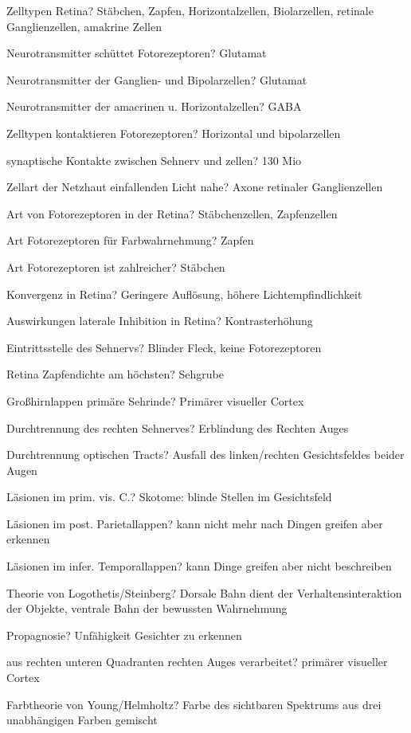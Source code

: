 \documentclass[a4paper]{article}
\begin{document}
\begin{multicols}{3}
  Zelltypen Retina? Stäbchen, Zapfen, Horizontalzellen, Biolarzellen, retinale Ganglienzellen, amakrine Zellen

  Neurotransmitter schüttet Fotorezeptoren? Glutamat

  Neurotransmitter der Ganglien- und Bipolarzellen? Glutamat

  Neurotransmitter der amacrinen u. Horizontalzellen? GABA

  Zelltypen kontaktieren Fotorezeptoren? Horizontal und bipolarzellen

  synaptische Kontakte zwischen Sehnerv und zellen? 130 Mio

  Zellart der Netzhaut einfallenden Licht nahe? Axone retinaler Ganglienzellen

  Art von Fotorezeptoren in der Retina? Stäbchenzellen, Zapfenzellen

  Art Fotorezeptoren für Farbwahrnehmung? Zapfen

  Art Fotorezeptoren ist zahlreicher? Stäbchen

  Konvergenz in Retina? Geringere Auflösung, höhere Lichtempfindlichkeit

  Auswirkungen laterale Inhibition in Retina? Kontrasterhöhung

  Eintrittsstelle des Sehnervs? Blinder Fleck, keine Fotorezeptoren

  Retina Zapfendichte am höchsten? Sehgrube

  Großhirnlappen primäre Sehrinde? Primärer visueller Cortex

  Durchtrennung des rechten Sehnerves? Erblindung des Rechten Auges

  Durchtrennung optischen Tracts? Ausfall des linken/rechten Gesichtsfeldes beider Augen

  Läsionen im prim. vis. C.? Skotome: blinde Stellen im Gesichtsfeld

  Läsionen im post. Parietallappen? kann nicht mehr nach Dingen greifen aber erkennen

  Läsionen im infer. Temporallappen? kann Dinge greifen aber nicht beschreiben

  Theorie von Logothetis/Steinberg? Dorsale Bahn dient der Verhaltensinteraktion der Objekte, ventrale Bahn der bewussten Wahrnehmung

  Propagnosie? Unfähigkeit Gesichter zu erkennen

  aus rechten unteren Quadranten rechten Auges verarbeitet? primärer visueller Cortex

  Farbtheorie von Young/Helmholtz? Farbe des sichtbaren Spektrums aus drei unabhängigen Farben gemischt


\end{multicols}
\end{document}
